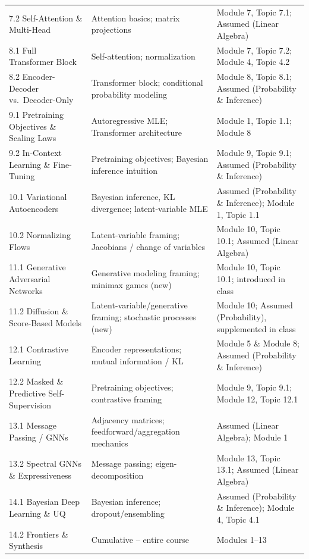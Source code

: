 \documentclass[11pt]{article}
\begin{document}
\begin{longtable}{@{}p{4.6cm}p{5.4cm}p{5.2cm}@{}}
7.2 Self-Attention \& Multi-Head & Attention basics; matrix projections & Module 7, Topic 7.1; Assumed (Linear Algebra) \\
8.1 Full Transformer Block & Self-attention; normalization & Module 7, Topic 7.2; Module 4, Topic 4.2 \\
8.2 Encoder-Decoder vs.\ Decoder-Only & Transformer block; conditional probability modeling & Module 8, Topic 8.1; Assumed (Probability \& Inference) \\
9.1 Pretraining Objectives \& Scaling Laws & Autoregressive MLE; Transformer architecture & Module 1, Topic 1.1; Module 8 \\
9.2 In-Context Learning \& Fine-Tuning & Pretraining objectives; Bayesian inference intuition & Module 9, Topic 9.1; Assumed (Probability \& Inference) \\
10.1 Variational Autoencoders & Bayesian inference, KL divergence; latent-variable MLE & Assumed (Probability \& Inference); Module 1, Topic 1.1 \\
10.2 Normalizing Flows & Latent-variable framing; Jacobians / change of variables & Module 10, Topic 10.1; Assumed (Linear Algebra) \\
11.1 Generative Adversarial Networks & Generative modeling framing; minimax games (new) & Module 10, Topic 10.1; introduced in class \\
11.2 Diffusion \& Score-Based Models & Latent-variable/generative framing; stochastic processes (new) & Module 10; Assumed (Probability), supplemented in class \\
12.1 Contrastive Learning & Encoder representations; mutual information / KL & Module 5 \& Module 8; Assumed (Probability \& Inference) \\
12.2 Masked \& Predictive Self-Supervision & Pretraining objectives; contrastive framing & Module 9, Topic 9.1; Module 12, Topic 12.1 \\
13.1 Message Passing / GNNs & Adjacency matrices; feedforward/aggregation mechanics & Assumed (Linear Algebra); Module 1 \\
13.2 Spectral GNNs \& Expressiveness & Message passing; eigen-decomposition & Module 13, Topic 13.1; Assumed (Linear Algebra) \\
14.1 Bayesian Deep Learning \& UQ & Bayesian inference; dropout/ensembling & Assumed (Probability \& Inference); Module 4, Topic 4.1 \\
14.2 Frontiers \& Synthesis & Cumulative -- entire course & Modules 1--13 \\
\bottomrule
\end{longtable}
\end{document}
